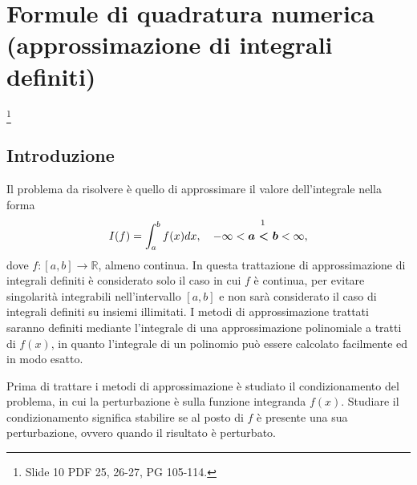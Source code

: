 \section{Formule di quadratura numerica (approssimazione di integrali definiti)}
\footnote{Slide 10 PDF 25, 26-27, PG 105-114.}
\subsection{Introduzione}
Il problema da risolvere è quello di approssimare il valore dell'integrale nella forma
\begin{equation}\label{eq:probQuadratura}
    I(f)=\int_{a}^{b}f(x) dx,\quad -\infty<\overset{\footnotemark}{\boldsymbol{a<b}}<\infty ,
\end{equation}
dove $f:[a,b]\rightarrow\mathbb R$, almeno continua. In questa trattazione di approssimazione di integrali definiti è considerato solo il caso in cui $f$ è continua, per evitare singolarità integrabili nell'intervallo $[a,b]$ e non sarà considerato il caso di integrali definiti su insiemi illimitati. I metodi di approssimazione trattati saranno definiti mediante l'integrale di una approssimazione polinomiale a tratti di $f(x)$, in quanto l'integrale di un polinomio può essere calcolato facilmente ed in modo esatto.

Prima di trattare i metodi di approssimazione è studiato il condizionamento del problema, in cui la perturbazione è sulla funzione integranda $f(x)$. Studiare il condizionamento significa stabilire se al posto di $f$ è presente una sua perturbazione, ovvero quando il risultato è perturbato.

